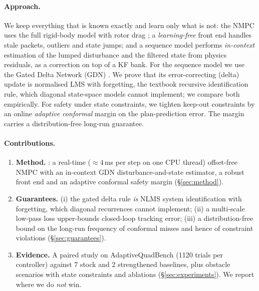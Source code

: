 \paragraph{Approach.}
We keep everything that is known exactly and learn only what is not: the NMPC uses the full rigid-body model with rotor drag \citep{faessler2018differential}; a \emph{learning-free} front end handles stale packets, outliers and state jumps; and a sequence model performs \emph{in-context} estimation of the lumped disturbance and the filtered state from physics residuals, as a correction on top of a KF bank.
For the sequence model we use the Gated Delta Network (GDN) \citep{yang2025gated}. We prove that its error-correcting (delta) update is normalised LMS with forgetting, the textbook recursive identification rule, which diagonal state-space models \citep{gu2023mamba} cannot implement; we compare both empirically.
For safety under state constraints, we tighten keep-out constraints by an online \emph{adaptive conformal} margin \citep{gibbs2021adaptive} on the plan-prediction error. The margin carries a distribution-free long-run guarantee.

\paragraph{Contributions.}
\begin{enumerate}
  \item \textbf{Method.} \ours{}: a real-time (${\approx}4$\,ms per step on one CPU thread) offset-free NMPC with an in-context GDN disturbance-and-state estimator, a robust front end and an adaptive conformal safety margin (\S\ref{sec:method}).
  \item \textbf{Guarantees.} (i) the gated delta rule \emph{is} NLMS system identification with forgetting, which diagonal recurrences cannot implement; (ii) a multi-scale low-pass loss upper-bounds closed-loop tracking error; (iii) a distribution-free bound on the long-run frequency of conformal misses and hence of constraint violations (\S\ref{sec:guarantees}).
  \item \textbf{Evidence.} A paired study on AdaptiveQuadBench \citep{zhang2025adaptivequadbench} (1120 trials per controller) against 7 stock and 2 strengthened baselines, plus obstacle scenarios with state constraints and ablations (\S\ref{sec:experiments}). We report where we do \emph{not} win.
\end{enumerate}
